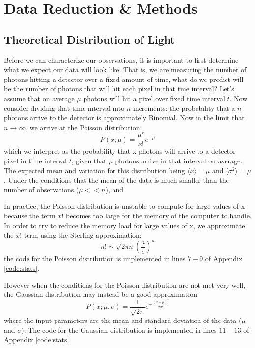 \documentclass[preprint]{aastex62}
\begin{document}
\section{Data Reduction \& Methods}
\subsection{Theoretical Distribution of Light}
Before we can characterize our observations, it is important to first determine what we expect our data will look like. That is, we are measuring the number of photons hitting a detector over a fixed amount of time, what do we predict will be the number of photons that will hit each pixel in that tme interval? Let's assume that on average $\mu$ photons will hit a pixel over fixed time interval $t$. Now consider dividing that time interval into $n$ increments: the probability that a $n$ photons arrive to the detector is approximately Binomial. Now in the limit that $n\rightarrow\infty$, we arrive at the Poisson distribution:
\begin{equation}
P(x;\mu) = \frac{\mu^x}{x!}e^{-\mu}
\end{equation}
which we interpret as the probability that x photons will arrive to a detector pixel in time interval $t$, given that $\mu$ photons arrive in that interval on average. The expected mean and variation for this distribution being $\langle x \rangle = \mu$ and $\langle \sigma^2 \rangle = \mu$. Under the conditions that the mean of the data is much smaller than the number of observations ($\mu << n$), and 

In practice, the Poisson distribution is unstable to compute for large values of x because the term $x!$ becomes too large for the memory of the computer to handle. In order to try to reduce the memory load for large values of x, we approximate the $x!$ term using the Sterling approximation:
\begin{equation}
n! \sim \sqrt{2\pi n}\left(\frac{n}{e} \right)^n
\end{equation}
the code for the Poisson distribution is implemented in lines $7-9$ of Appendix \ref{code:stats}.

However when the conditions for the Poisson distribution are not met very well, the Gaussian distribution may instead be a good approximation:
\begin{equation}
P(x; \mu, \sigma) = \frac{1}{\sqrt{2\pi}} e^{-\frac{(x-\mu)^2}{2\sigma^2}}
\end{equation}
where the input parameters are the mean and standard deviation of the data ($\mu$ and $\sigma$). The code for the Gaussian distribution is implemented in lines $11-13$ of Appendix \ref{code:stats}. 
\end{document}
